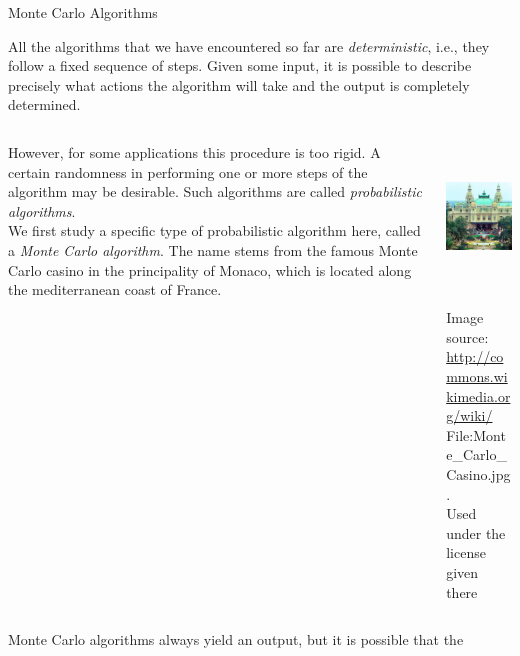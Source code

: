 \documentclass[smaller,hyperref={CJKbookmarks=true}]{beamer}
\begin{document}
\begin{frame}{Monte Carlo Algorithms}
\begin{spacing}{1.1}
All the algorithms that we have encountered so far are \emph{deterministic}, i.e.,
they follow a fixed sequence of steps. Given some input, it is possible to
describe precisely what actions the algorithm will take and the output is
completely determined.\\[6pt]
\begin{columns}[onlytextwidth]
\begin{column}{0.6\textwidth}
However, for some applications this procedure
is too rigid. A certain randomness in
performing one or more steps of the algorithm
may be desirable. Such algorithms
are called \emph{probabilistic algorithms}.\\[5pt]
We first study a specific type of probabilistic
algorithm here, called a \emph{Monte Carlo
algorithm}. The name stems from the famous
Monte Carlo casino in the principality
of Monaco, which is located along the
mediterranean coast of France.
\end{column}
\begin{column}{0.35\textwidth}
\begin{spacing}{0.5}
\includegraphics[width=\columnwidth,height=110pt]{monte.jpg}\\
\begin{center}
\begin{tiny}
\vspace*{-6pt}
Image source:\\
\url{http://commons.wikimedia.org/wiki/}\\
File:Monte\_Carlo\_Casino.jpg.\\
Used under the license given there
\end{tiny}
\end{center}
\end{spacing}
\end{column}
\end{columns}
\newpage
\vspace*{9pt}
Monte Carlo algorithms always yield an output, but it is possible that the

\end{spacing}
\end{frame}
\end{document}

